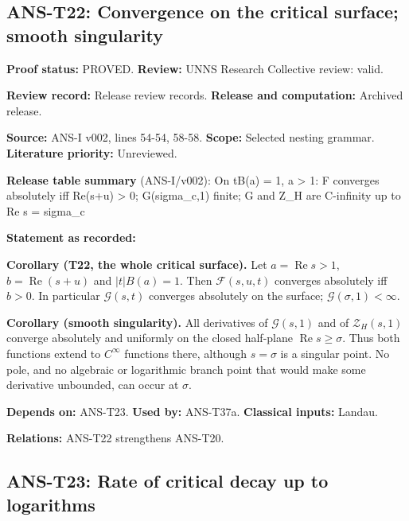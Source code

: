 \documentclass[
  11pt,
]{article}
\begin{document}
\hypertarget{ans-t22-convergence-on-the-critical-surface-smooth-singularity}{%
\subsection{ANS-T22: Convergence on the critical surface; smooth
singularity}\label{ans-t22-convergence-on-the-critical-surface-smooth-singularity}}

\textbf{Proof status:} PROVED. \textbf{Review:} UNNS Research Collective
review: valid.

\textbf{Review record:} Release review records. \textbf{Release and
computation:} Archived release.

\textbf{Source:} ANS-I v002, lines 54-54, 58-58. \textbf{Scope:}
Selected nesting grammar. \textbf{Literature priority:} Unreviewed.

\textbf{Release table summary} (ANS-I/v002): On \textbar t\textbar B(a)
= 1, a \textgreater{} 1: F converges absolutely iff Re(s+u)
\textgreater{} 0; G(sigma\_c,1) finite; G and Z\_H are C-infinity up to
Re s = sigma\_c

\textbf{Statement as recorded:}

\textbf{Corollary (T22, the whole critical surface).} Let
\(a=\operatorname{Re}s>1\), \(b=\operatorname{Re}(s+u)\) and
\(|t|B(a)=1\). Then \(\mathcal F(s,u,t)\) converges absolutely iff
\(b>0\). In particular \(\mathcal G(s,t)\) converges absolutely on the
surface; \(\mathcal G(\sigma,1)<\infty\).

\textbf{Corollary (smooth singularity).} All derivatives of
\(\mathcal G(s,1)\) and of \(\mathcal Z_H(s,1)\) converge absolutely and
uniformly on the closed half-plane \(\operatorname{Re}s\ge\sigma\). Thus
both functions extend to \(C^\infty\) functions there, although
\(s=\sigma\) is a singular point. No pole, and no algebraic or
logarithmic branch point that would make some derivative unbounded, can
occur at \(\sigma\).

\textbf{Depends on:} ANS-T23. \textbf{Used by:} ANS-T37a.
\textbf{Classical inputs:} Landau.

\textbf{Relations:} ANS-T22 strengthens ANS-T20.

\hypertarget{ans-t23-rate-of-critical-decay-up-to-logarithms}{%
\subsection{ANS-T23: Rate of critical decay up to
logarithms}\label{ans-t23-rate-of-critical-decay-up-to-logarithms}}
\end{document}
